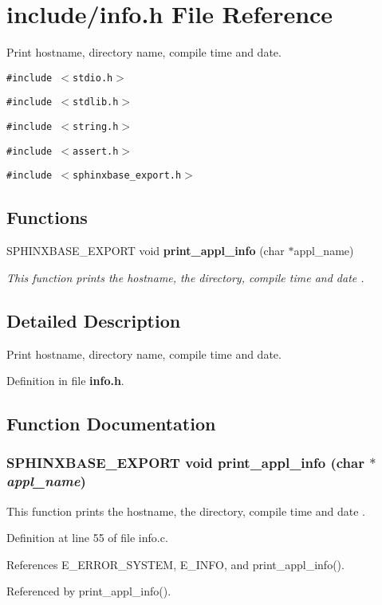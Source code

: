\section{include/info.h File Reference}
\label{info_8h}
Print hostname, directory name, compile time and date.  


{\tt \#include $<$stdio.h$>$}\par
{\tt \#include $<$stdlib.h$>$}\par
{\tt \#include $<$string.h$>$}\par
{\tt \#include $<$assert.h$>$}\par
{\tt \#include $<$sphinxbase\_\-export.h$>$}\par
\subsection*{Functions}
\begin{CompactItemize}
\item 
SPHINXBASE\_\-EXPORT void {\bf print\_\-appl\_\-info} (char $\ast$appl\_\-name)
\begin{CompactList}\small\item\em This function prints the hostname, the directory, compile time and date . \item\end{CompactList}\end{CompactItemize}


\subsection{Detailed Description}
Print hostname, directory name, compile time and date. 



Definition in file {\bf info.h}.

\subsection{Function Documentation}
\subsubsection[{print\_\-appl\_\-info}]{\setlength{\rightskip}{0pt plus 5cm}SPHINXBASE\_\-EXPORT void print\_\-appl\_\-info (char $\ast$ {\em appl\_\-name})}\label{info_8h_997bdb77d55433471acc38ea58bc34ce}


This function prints the hostname, the directory, compile time and date . 



Definition at line 55 of file info.c.

References E\_\-ERROR\_\-SYSTEM, E\_\-INFO, and print\_\-appl\_\-info().

Referenced by print\_\-appl\_\-info().